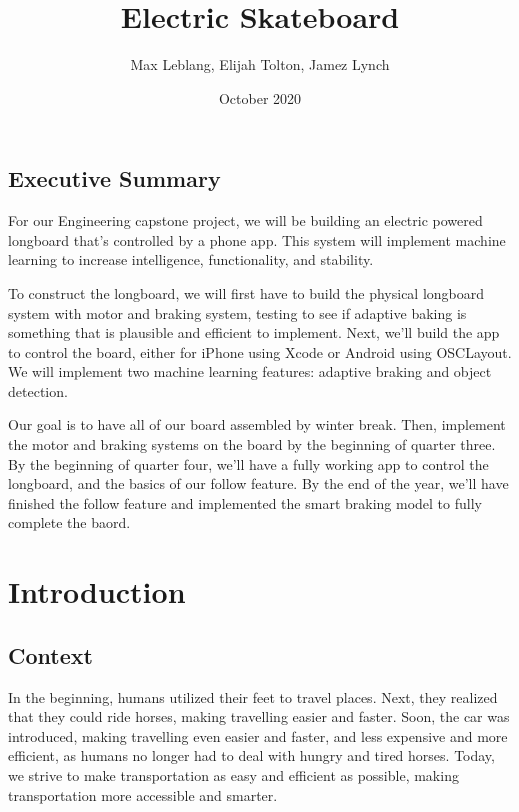\documentclass{article}
\title{Electric Skateboard}
\author{Max Leblang, Elijah Tolton, Jamez Lynch}
\date{October 2020}
\begin{document}
\maketitle

\begin{center}
    \section*{Executive Summary}
\end{center}

For our Engineering capstone project, we will be building an electric powered longboard that's controlled by a phone app. This system will implement machine learning to increase intelligence, functionality, and stability.

To construct the longboard, we will first have to build the physical longboard system with motor and braking system, testing to see if adaptive baking is something that is plausible and efficient to implement. Next, we'll build the app to control the board, either for iPhone using Xcode or Android using OSCLayout. We will implement two machine learning features: adaptive braking and object detection.

Our goal is to have all of our board assembled by winter break. Then, implement the motor and braking systems on the board by the beginning of quarter three. By the beginning of quarter four, we'll have a fully working app to control the longboard, and the basics of our follow feature. By the end of the year, we'll have finished the follow feature and implemented the smart braking model to fully complete the baord.

\tableofcontents

\section{Introduction}

\subsection{Context}
In the beginning, humans utilized their feet to travel places. Next, they realized that they could ride horses, making travelling easier and faster. Soon, the car was introduced, making travelling even easier and faster, and less expensive and more efficient, as humans no longer had to deal with hungry and tired horses. Today, we strive to make transportation as easy and efficient as possible, making transportation more accessible and smarter.
\end{document}

